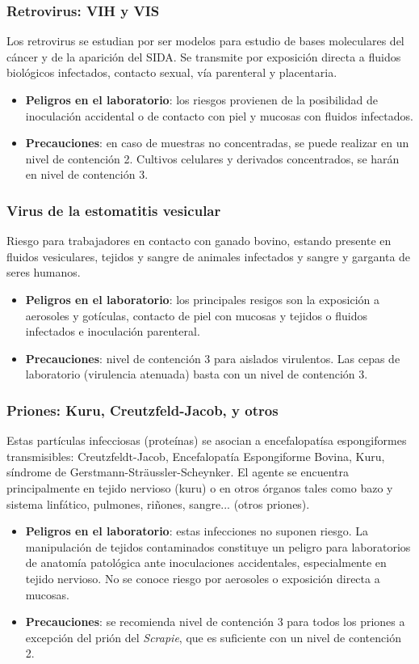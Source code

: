 \subsubsection{Retrovirus: VIH y VIS}
Los retrovirus se estudian por ser modelos para estudio de bases moleculares del cáncer y de la aparición del SIDA. Se transmite por exposición directa a fluidos biológicos infectados, contacto sexual, vía parenteral y placentaria.
\begin{itemize}[itemsep=0pt,parsep=0pt,topsep=0pt,partopsep=0pt]
    \item \textbf{Peligros en el laboratorio}: los riesgos provienen de la posibilidad de inoculación accidental o de contacto con piel y mucosas con fluidos infectados.
    \item \textbf{Precauciones}:  en caso de muestras no concentradas, se puede realizar en un nivel de contención 2. Cultivos celulares y derivados concentrados, se harán en nivel de contención 3.
\end{itemize}
\subsubsection{Virus de la estomatitis vesicular}
Riesgo para trabajadores en contacto con ganado bovino, estando presente en fluidos vesiculares, tejidos y sangre de animales infectados y sangre y garganta de seres humanos.
\begin{itemize}[itemsep=0pt,parsep=0pt,topsep=0pt,partopsep=0pt]
    \item \textbf{Peligros en el laboratorio}: los principales resigos son la exposición a aerosoles y gotículas, contacto de piel con mucosas y tejidos o fluidos infectados e inoculación parenteral.
    \item \textbf{Precauciones}:  nivel de contención 3 para aislados virulentos. Las cepas de laboratorio (virulencia atenuada) basta con un nivel de contención 3.
\end{itemize}
\subsubsection{Priones: Kuru, Creutzfeld-Jacob, y otros}
Estas partículas infecciosas (proteínas) se asocian a encefalopatísa espongiformes transmisibles: Creutzfeldt-Jacob, Encefalopatía Espongiforme Bovina, Kuru, síndrome de Gerstmann-Sträussler-Scheynker. El agente se encuentra principalmente en tejido nervioso (kuru) o en otros órganos  tales como bazo y sistema linfático, pulmones, riñones, sangre... (otros priones).
\begin{itemize}[itemsep=0pt,parsep=0pt,topsep=0pt,partopsep=0pt]
    \item \textbf{Peligros en el laboratorio}: estas infecciones no suponen riesgo. La manipulación de tejidos contaminados constituye un peligro para laboratorios de anatomía patológica ante inoculaciones accidentales, especialmente en tejido nervioso. No se conoce riesgo por aerosoles o exposición directa a mucosas.
    \item \textbf{Precauciones}:  se recomienda nivel de contención 3 para todos los priones a excepción del prión del \textit{Scrapie}, que es suficiente con un nivel de contención 2.
\end{itemize}

